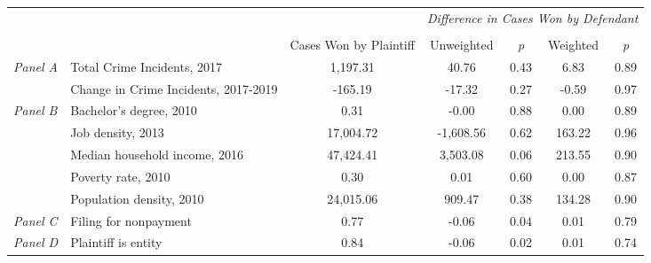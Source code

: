 \begin{tabular}{llccccc}
\toprule
 &  & \textit{} & \multicolumn{4}{c}{\textit{Difference in Cases Won by Defendant}} \\
\cline{4-7}
\\
 &  & Cases Won by Plaintiff & Unweighted & \emph{p} & Weighted & \emph{p} \\
\midrule
\multirow[c]{2}{.75cm}{\textit{Panel A}} & Total Crime Incidents, 2017 & 1,197.31 & 40.76 & 0.43 & 6.83 & 0.89 \\
 & Change in Crime Incidents, 2017-2019 & -165.19 & -17.32 & 0.27 & -0.59 & 0.97 \\
\cline{1-7}
\multirow[c]{5}{.75cm}{\textit{Panel B}} & Bachelor's degree, 2010 & 0.31 & -0.00 & 0.88 & 0.00 & 0.89 \\
 & Job density, 2013 & 17,004.72 & -1,608.56 & 0.62 & 163.22 & 0.96 \\
 & Median household income, 2016 & 47,424.41 & 3,503.08 & 0.06 & 213.55 & 0.90 \\
 & Poverty rate, 2010 & 0.30 & 0.01 & 0.60 & 0.00 & 0.87 \\
 & Population density, 2010 & 24,015.06 & 909.47 & 0.38 & 134.28 & 0.90 \\
\cline{1-7}
\textit{Panel C} & Filing for nonpayment & 0.77 & -0.06 & 0.04 & 0.01 & 0.79 \\
\cline{1-7}
\textit{Panel D} & Plaintiff is entity & 0.84 & -0.06 & 0.02 & 0.01 & 0.74 \\
\cline{1-7}
\bottomrule
\end{tabular}
